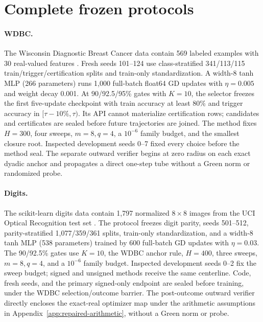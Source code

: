 \documentclass{article}
\begin{document}


\section{Complete frozen protocols}
\label{app:protocols}

\paragraph{WDBC.}
The Wisconsin Diagnostic Breast Cancer data contain 569 labeled examples with
30 real-valued features \citep{wolberg1995wdbc,street1993nuclear}.  Fresh seeds
101--124 use class-stratified 341/113/115 train/trigger/certification splits and
train-only standardization.  A width-8 tanh MLP (266 parameters) runs 1,000
full-batch float64 GD updates with $\eta=0.005$ and weight decay 0.001.  At
90/92.5/95\% gates with $K=10$, the selector freezes the first five-update
checkpoint with train accuracy at least 80\% and trigger accuracy in
$[\tau-10\%,\tau)$.  Its API cannot materialize certification rows; candidates
and certificates are sealed before future trajectories are joined.  The method
fixes $H=300$, four sweeps, $m=8,q=4$, a $10^{-6}$ family budget, and the
smallest closure root.  Inspected development seeds 0--7 fixed every choice
before the method seal.  The separate outward verifier begins at zero radius on
each exact dyadic anchor and propagates a direct one-step tube without a Green
norm or randomized probe.

\paragraph{Digits.}
The scikit-learn digits data contain 1,797 normalized $8\times8$ images from
the UCI Optical Recognition test set \citep{alpaydin1998digits}.  The protocol
freezes digit parity, seeds 501--512, parity-stratified 1,077/359/361 splits,
train-only standardization, and a width-8 tanh MLP (538 parameters) trained by
600 full-batch GD updates with $\eta=0.03$.  The 90/92.5\% gates use $K=10$,
the WDBC anchor rule, $H=400$, three sweeps, $m=8,q=4$, and a $10^{-6}$
family budget.  Inspected development seeds 0--2 fix the sweep budget; signed
and unsigned methods receive the same centerline.  Code, fresh seeds, and the
primary signed-only endpoint are sealed before training, under the WDBC
selection/outcome barrier.  The post-outcome outward verifier directly encloses
the exact-real optimizer map under the arithmetic assumptions in
Appendix~\ref{app:repaired-arithmetic}, without a Green norm or probe.
\end{document}
